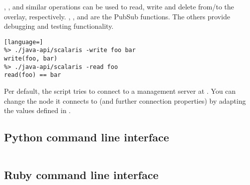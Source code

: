 , ,  and similar operations can be used to read, write
and delete from/to the overlay, respectively. ,
, and  are the PubSub functions. The others
provide debugging and testing functionality.

\begin{lstlisting}[language=]
%> ./java-api/scalaris -write foo bar
write(foo, bar)
%> ./java-api/scalaris -read foo
read(foo) == bar
\end{lstlisting}

Per default, the  script tries to connect to a management
server at . You can change the node it connects to (and
further connection properties) by adapting the values defined in
.

\subsection{Python command line interface}

\begin{lstlisting}[language=sh]
%> ./python-api/scalaris_client.py --help
\end{lstlisting}


\subsection{Ruby command line interface}

\begin{lstlisting}[language=sh]
%> ../ruby-api/scalaris_client.rb --help
\end{lstlisting}

